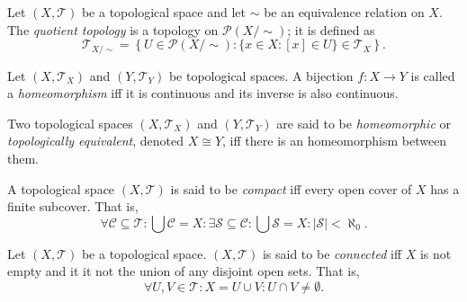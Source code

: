 \begin{definition}
	\label{def: quotient topology}
	Let $(X, \mathcal T)$ be a topological space and let $\sim$ be an equivalence relation on $X$. The \textit{quotient topology} is a topology on $\mathcal P(X/ \sim)$; it is defined as
	$$
	\mathcal T_{X / \sim} = \left\{ U \in \mathcal P(X/\sim) : \{ x \in X: [x] \in U \} \in \mathcal T_X \right\}.
	$$
\end{definition}


\begin{definition}
	[homeomorphisms]
	\label{def: homomorphisms}
	Let $(X, \mathcal T_X)$ and $(Y, \mathcal T_Y)$ be topological spaces. A bijection $f: X \to Y$ is called a \textit{homeomorphism} iff it is continuous and its inverse is also continuous.
\end{definition}


\begin{definition}
	[homeomorphic]
	\label{def: homomorphisms}
	Two topological spaces $(X, \mathcal T_X)$ and $(Y, \mathcal T_Y)$ are said to be \textit{homeomorphic} or \textit{topologically equivalent}, denoted $X \cong Y$, iff there is an homeomorphism between them.
\end{definition}


\begin{definition}
	[compactness]
	\label{def: compactness}
	A topological space $(X, \mathcal T)$ is said to be \textit{compact} iff every open cover of $X$ has a finite subcover. That is,
	$$
	\forall \mathcal C \subseteq \mathcal T : \bigcup \mathcal C = X : \exists \mathcal S \subseteq \mathcal C : \bigcup \mathcal S = X : |\mathcal S| < \aleph_0.
	$$
\end{definition}


\begin{definition}
	[connectedness]
	\label{def: connectedness}
	Let $(X, \mathcal T)$ be a topological space. $(X, \mathcal T)$ is said to be \textit{connected} iff $X$ is not empty and it it not the union of any disjoint open sets. That is,
	$$
	\forall U, V \in \mathcal T : X = U \cup V : U \cap V \ne \emptyset.
	$$
\end{definition}


